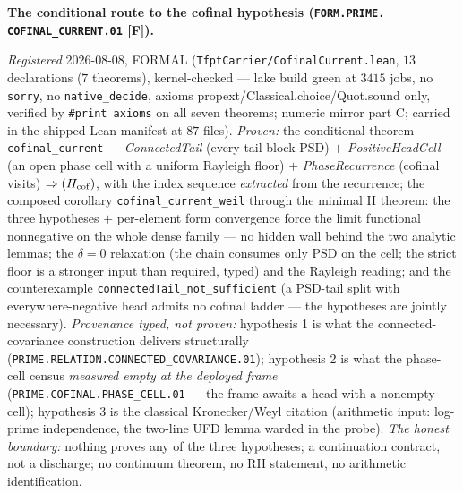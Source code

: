 \documentclass[11pt,a4paper]{article}
\begin{document}
\par\smallskip\noindent\textbf{The conditional route to the
cofinal hypothesis (\texttt{FORM.PRIME.\allowbreak
COFINAL\_CURRENT.01} [F]).}
{\sloppy
\emph{Registered} 2026-08-08, FORMAL
(\texttt{TfptCarrier/CofinalCurrent.lean}, $13$ declarations
($7$ theorems), kernel-checked --- lake build green at $3415$
jobs, no \texttt{sorry}, no \texttt{native\_decide}, axioms
propext/Classical.choice/Quot.sound only, verified by
\texttt{\#print axioms} on all seven theorems; numeric mirror
 part C; carried in the
shipped Lean manifest at $87$ files).  \emph{Proven:} the
conditional theorem \texttt{cofinal\_current} ---
\emph{ConnectedTail} (every tail block PSD) $+$
\emph{PositiveHeadCell} (an open phase cell with a uniform
Rayleigh floor) $+$ \emph{PhaseRecurrence} (cofinal visits)
$\Rightarrow (H_{\rm cof})$, with the index sequence
\emph{extracted} from the recurrence; the composed corollary
\texttt{cofinal\_current\_weil} through the minimal H theorem:
the three hypotheses $+$ per-element form convergence force the
limit functional nonnegative on the whole dense family --- no
hidden wall behind the two analytic lemmas; the $\delta = 0$
relaxation (the chain consumes only PSD on the cell; the strict
floor is a stronger input than required, typed) and the
Rayleigh reading; and the counterexample
\texttt{connectedTail\_not\_sufficient} (a PSD-tail split with
everywhere-negative head admits no cofinal ladder --- the
hypotheses are jointly necessary).  \emph{Provenance typed, not
proven:} hypothesis 1 is what the connected-covariance
construction delivers structurally
(\texttt{PRIME.RELATION.CONNECTED\_COVARIANCE.01}); hypothesis
2 is what the phase-cell census \emph{measured empty at the
deployed frame} (\texttt{PRIME.COFINAL.PHASE\_CELL.01} ---
the frame awaits a head with a nonempty cell); hypothesis 3 is
the classical Kronecker/Weyl citation (arithmetic input:
log-prime independence, the two-line UFD lemma warded in the
probe).  \emph{The honest boundary:} nothing proves any of the
three hypotheses; a continuation contract, not a discharge; no
continuum theorem, no RH statement, no arithmetic
identification.\par}
\end{document}
